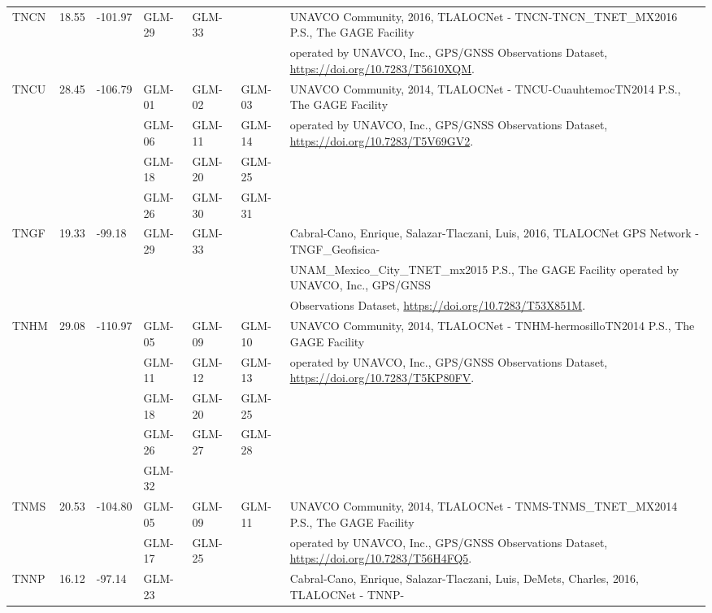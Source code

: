 \begin{landscape}
\begin{longtable}{llllllp{12cm}}
    \multirow{2}{*}{TNCN} & \multirow{2}{*}{18.55} & \multirow{2}{*}{-101.97} & \multirow{2}{*}{GLM-29} & \multirow{2}{*}{GLM-33} & & UNAVCO Community, 2016, TLALOCNet - TNCN-TNCN\_TNET\_MX2016 P.S., The GAGE Facility \\
    &&&&&& operated by UNAVCO, Inc., GPS/GNSS Observations Dataset, \url{https://doi.org/10.7283/T5610XQM}.\\\hline
    \multirow{4}{*}{TNCU} & \multirow{4}{*}{28.45} & \multirow{4}{*}{-106.79} & GLM-01 & GLM-02 & GLM-03  & UNAVCO Community, 2014, TLALOCNet - TNCU-CuauhtemocTN2014 P.S., The GAGE Facility \\
    &&& GLM-06 & GLM-11 & GLM-14 & operated by UNAVCO, Inc., GPS/GNSS Observations Dataset, \url{https://doi.org/10.7283/T5V69GV2}.\\
    &&& GLM-18 & GLM-20 & GLM-25 & \\
    &&& GLM-26 & GLM-30 & GLM-31 & \\\hline
    \multirow{3}{*}{TNGF} & \multirow{3}{*}{19.33} & \multirow{3}{*}{-99.18} & \multirow{3}{*}{GLM-29} & \multirow{3}{*}{GLM-33} & & Cabral-Cano, Enrique, Salazar-Tlaczani, Luis, 2016, TLALOCNet GPS Network - TNGF\_Geofisica-\\
    &&&&&& UNAM\_Mexico\_City\_TNET\_mx2015 P.S., The GAGE Facility operated by UNAVCO, Inc., GPS/GNSS \\
    &&&&&& Observations Dataset, \url{https://doi.org/10.7283/T53X851M}. \\\hline
    \multirow{5}{*}{TNHM} & \multirow{5}{*}{29.08} & \multirow{5}{*}{-110.97} & GLM-05 & GLM-09 & GLM-10 & UNAVCO Community, 2014, TLALOCNet - TNHM-hermosilloTN2014 P.S., The GAGE Facility \\
    &&& GLM-11 & GLM-12 & GLM-13 & operated by UNAVCO, Inc., GPS/GNSS Observations Dataset, \url{https://doi.org/10.7283/T5KP80FV}.\\
    &&& GLM-18 & GLM-20 & GLM-25 & \\
    &&& GLM-26 & GLM-27 & GLM-28 & \\
    &&& GLM-32 &        &        & \\\hline
    \multirow{2}{*}{TNMS} & \multirow{2}{*}{20.53} & \multirow{2}{*}{-104.80} & GLM-05 & GLM-09 & GLM-11  & UNAVCO Community, 2014, TLALOCNet - TNMS-TNMS\_TNET\_MX2014 P.S., The GAGE Facility \\
    &&& GLM-17 & GLM-25 & & operated by UNAVCO, Inc., GPS/GNSS Observations Dataset, \url{https://doi.org/10.7283/T56H4FQ5}.\\\hline
    \multirow{3}{*}{TNNP} & \multirow{3}{*}{16.12} & \multirow{3}{*}{-97.14} & \multirow{3}{*}{GLM-23} & & & Cabral-Cano, Enrique, Salazar-Tlaczani, Luis, DeMets, Charles, 2016, TLALOCNet - TNNP-\\

\end{longtable}
\end{landscape}
